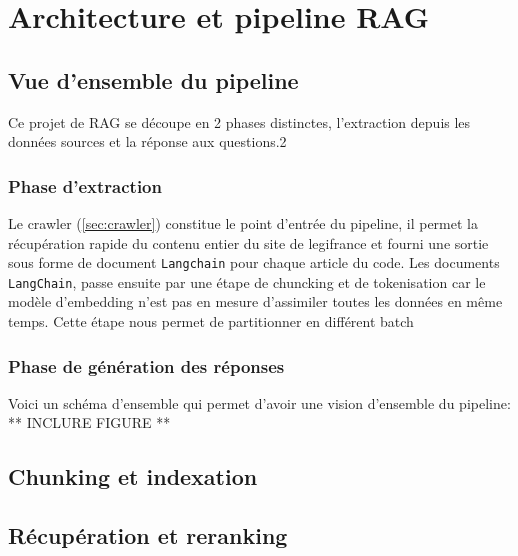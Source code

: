 \chapter{Architecture et pipeline RAG}


\section{Vue d'ensemble du pipeline}
Ce projet de RAG se découpe en 2 phases distinctes, l'extraction depuis les données sources et la réponse aux questions.2

\subsection{Phase d'extraction}
Le crawler (\ref{sec:crawler}) constitue le point d'entrée du pipeline, il permet la récupération rapide du contenu entier du site de legifrance et fourni une sortie sous forme de document \texttt{Langchain} pour chaque article du code.
Les documents \texttt{LangChain}, passe ensuite par une étape de chuncking et de tokenisation car le modèle d'embedding n'est pas en mesure d'assimiler toutes les données en même temps. Cette étape nous permet de partitionner en différent batch

\subsection{Phase de génération des réponses}

Voici un schéma d'ensemble qui permet d'avoir une vision d'ensemble du pipeline:
** INCLURE FIGURE **

\section{Chunking et indexation}

\section{Récupération et reranking}

